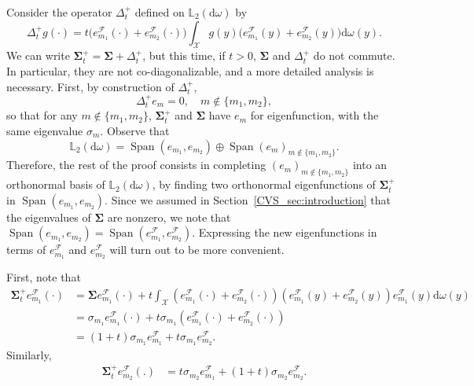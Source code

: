 \documentclass[twoside,11pt]{book}
\numberwithin{theorem}{chapter}
\numberwithin{definition}{chapter}
\numberwithin{proposition}{chapter}
\numberwithin{corollary}{chapter}
\numberwithin{example}{chapter}
\numberwithin{lemma}{chapter}
\numberwithin{assumption}{chapter}
\numberwithin{equation}{chapter}
\numberwithin{figure}{chapter}
\DeclareMathOperator{\Span}{\mathrm{Span}}
\DeclareMathOperator{\F}{\mathcal{F}}
\DeclareMathOperator{\X}{\mathcal{X}}
\def\Ltwo{\mathbb{L}_{2}(\mathrm{d} \omega)}
\begin{document}
Consider the operator $\Delta_{t}^{+}$ defined on $\Ltwo$ by
\begin{equation}
\Delta_{t}^{+}g(\cdot) = t \bigg(e_{m_{1}}^{\F}(\cdot)+e_{m_{2}}^{\F}(\cdot) \bigg) \int_{\X} g(y) \bigg(e_{m_{1}}^{\F}(y)+e_{m_{2}}^{\F}(y) \bigg) \mathrm{d}\omega(y).
\end{equation}
We can write $\bm{\Sigma}_{t}^{+} = \bm{\Sigma} + \Delta_{t}^{+}$, but this time, if $t>0$, $\bm{\Sigma}$ and $\Delta_{t}^{+}$ do not commute. In particular, they are not co-diagonalizable, and a more detailed analysis is necessary. First, by construction of $\Delta_{t}^{+}$,
$$
\Delta_{t}^{+} e_m = 0, \quad m\notin\{m_1,m_2\},
$$
so that for any $m\notin\{m_1,m_2\}$, $\bm{\Sigma}_{t}^{+}$ and $\bm{\Sigma}$ have $e_m$ for eigenfunction, with the same eigenvalue $\sigma_m$. Observe that
\begin{equation}
\Ltwo = \Span (e_{m_1},e_{m_2}) \oplus \Span (e_{m})_{m \notin \{m_1,m_2\}}.
\end{equation}
Therefore, the rest of the proof consists in completing $(e_m)_{m\notin\{m_1,m_2\}}$ into an orthonormal basis of $\Ltwo$, by finding two orthonormal eigenfunctions of $\bm{\Sigma}_{t}^{+}$ in $\Span (e_{m_{1}},e_{m_{2}})$.
Since we assumed in Section~\ref{CVS_sec:introduction} that the eigenvalues of $\bm{\Sigma}$ are nonzero, we note that $\Span (e_{m_{1}},e_{m_{2}}) = \Span (e_{m_{1}}^{\F},e_{m_{2}}^{\F})$. Expressing the new eigenfunctions in terms of $e_{m_{1}}^{\F}$ and $e_{m_{2}}^{\F}$ will turn out to be more convenient.

First, note that 
\begin{align}
\bm{\Sigma}_{t}^{+}e_{m_{1}}^{\mathcal{F}}(\cdot) & = \bm{\Sigma} e_{m_{1}}^{\mathcal{F}}(\cdot) + t \int_{\mathcal{X}} \left(e_{m_{1}}^{\mathcal{F}}(\cdot) + e_{m_{2}}^{\mathcal{F}}(\cdot) \right)\left( e_{m_{1}}^{\mathcal{F}}(y) + e_{m_{2}}^{\mathcal{F}}(y) \right) e_{m_{1}}^{\mathcal{F}}(y) \mathrm{d}\omega(y) \\
& = \sigma_{m_{1}} e_{m_{1}}^{\mathcal{F}}(\cdot) + t \sigma_{m_{1}} \left(e_{m_{1}}^{\mathcal{F}}(\cdot) + e_{m_{2}}^{\mathcal{F}}(\cdot) \right)\\
& = (1+t) \sigma_{m_{1}}e_{m_{1}}^{\mathcal{F}} + t \sigma_{m_{1}} e_{m_{2}}^{\mathcal{F}}.\label{CVS_eq:sigma_t_plus_action}
\end{align}
Similarly,
\begin{align}
\bm{\Sigma}_{t}^{+}e_{m_{2}}^{\mathcal{F}}(.) & = t \sigma_{m_{2}} e_{m_{1}}^{\mathcal{F}} + (1+t) \sigma_{m_{2}}e_{m_{2}}^{\mathcal{F}}.\label{CVS_eq:sigma_t_plus_action_2}
\end{align}
\end{document}
